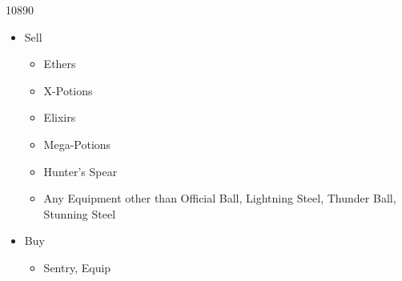 \begin{shop}{10890}
	\begin{itemize}
		\item Sell
			\begin{itemize}
				\item Ethers
				\item X-Potions
				\item Elixirs
				\item Mega-Potions
				\item Hunter's Spear
				\item Any Equipment other than Official Ball, Lightning Steel, Thunder Ball, Stunning Steel
			\end{itemize}
		\item Buy
			\begin{itemize}
				\item Sentry, Equip
			\end{itemize}
	\end{itemize}
\end{shop}
\vfill\
\colend
